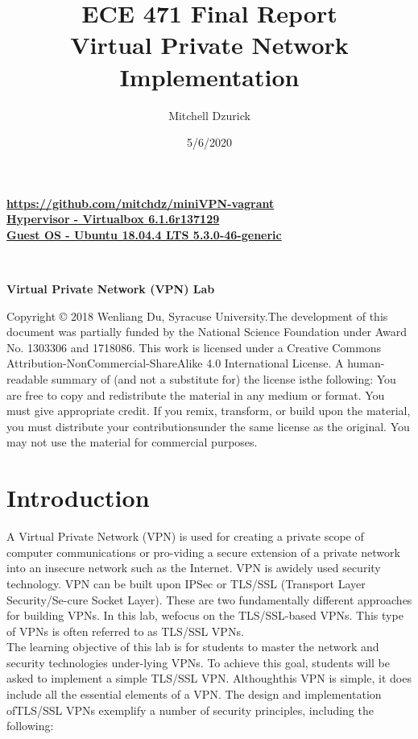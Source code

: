 \documentclass[12pt]{article}
\title {{\bf ECE 471 Final Report} \\
\large{Virtual Private Network Implementation}}
\author{Mitchell Dzurick}
\date{5/6/2020}
\newcommand\tab[1][0.5cm]{\hspace*{#1}}
\begin{document}
\maketitle
\begin{center}
\textbf{\href{https://github.com/mitchdz/miniVPN-vagrant}{https://github.com/mitchdz/miniVPN-vagrant}}\\
\textbf{\href{https://download.virtualbox.org/virtualbox/6.1.6/VirtualBox-6.1.6-137129-Win.exe}{Hypervisor - Virtualbox 6.1.6r137129}}\\
\textbf{\href{https://releases.ubuntu.com/18.04.4/ubuntu-18.04.4-desktop-amd64.iso}{Guest OS - Ubuntu 18.04.4 LTS 5.3.0-46-generic}}
\end{center}
\\
\tableofcontents 
\listoffigures
\clearpage



\begin{center}
    \textbf{Virtual Private Network (VPN) Lab}
\end{center}

Copyright © 2018  Wenliang Du, Syracuse University.The development of this document was partially funded by the National Science Foundation under Award No. 1303306 and 1718086.  This work is licensed under a Creative Commons Attribution-NonCommercial-ShareAlike 4.0 International License. A human-readable summary of (and not a substitute for) the license isthe following:  You are free to copy and redistribute the material in any medium or format.  You must give appropriate credit. If you remix, transform, or build upon the material, you must distribute your contributionsunder the same license as the original. You may not use the material for commercial purposes.

\section{Introduction}
A Virtual Private Network (VPN) is used for creating a private scope of computer communications or pro-viding a secure extension of a private network into an insecure network such as the Internet.   VPN is awidely used security technology.  VPN can be built upon IPSec or TLS/SSL (Transport Layer Security/Se-cure Socket Layer).  These are two fundamentally different approaches for building VPNs.  In this lab, wefocus on the TLS/SSL-based VPNs. This type of VPNs is often referred to as TLS/SSL VPNs. \\
\tab The learning objective of this lab is for students to master the network and security technologies under-lying VPNs.  To achieve this goal, students will be asked to implement a simple TLS/SSL VPN. Althoughthis VPN is simple, it does include all the essential elements of a VPN. The design and implementation ofTLS/SSL VPNs exemplify a number of security principles, including the following:
\end{document}
